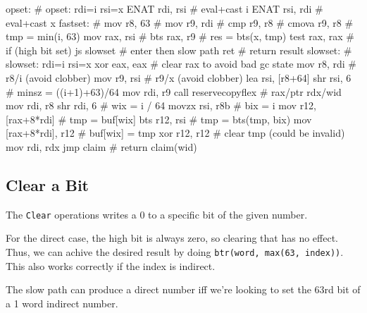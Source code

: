 \begin{asm}
opset:                                      # opset: rdi=i rsi=x
	ENAT	rdi, rsi                    #   eval+cast i
	ENAT	rsi, rdi                    #   eval+cast x
fastset:                                    #
	mov	r8, 63                      #
	mov	r9, rdi                     #
	cmp	r9, r8                      #
	cmova	r9, r8                      #   tmp = min(i, 63)
	mov	rax, rsi                    #
	bts	rax, r9                     #   res = bts(x, tmp)
	test	rax, rax                    #   if (high bit set)
	js	slowset                     #     enter then slow path
	ret                                 #   return result
slowset:                                    # slowset: rdi=i rsi=x
	xor	eax, eax                    #   clear rax to avoid bad gc state
	mov	r8, rdi                     #   r8/i (avoid clobber)
	mov	r9, rsi                     #   r9/x (avoid clobber)
	lea	rsi, [r8+64]
	shr	rsi, 6                      #   minsz = ((i+1)+63)/64
	mov	rdi, r9
	call	reservecopyflex             #   rax/ptr rdx/wid
	mov	rdi, r8
	shr	rdi, 6                      #   wix = i / 64
	movzx	rsi, r8b                    #   bix = i %
	mov	r12, [rax+8*rdi]            #   tmp = buf[wix]
	bts	r12, rsi                    #   tmp = bts(tmp, bix)
	mov	[rax+8*rdi], r12            #   buf[wix] = tmp
	xor	r12, r12                    #   clear tmp (could be invalid)
	mov	rdi, rdx
	jmp	claim                       #   return claim(wid)
\end{asm}

\subsection{Clear a Bit}

The \lstinline|Clear| operations writes a 0 to a specific bit of the given
number.

For the direct case, the high bit is always zero, so clearing that
has no effect.  Thus, we can achive the desired result by doing
\lstinline|btr(word, max(63, index))|.  This also works correctly if
the index is indirect.

The slow path can produce a direct number iff we're looking to set the 63rd bit
of a 1 word indirect number.


